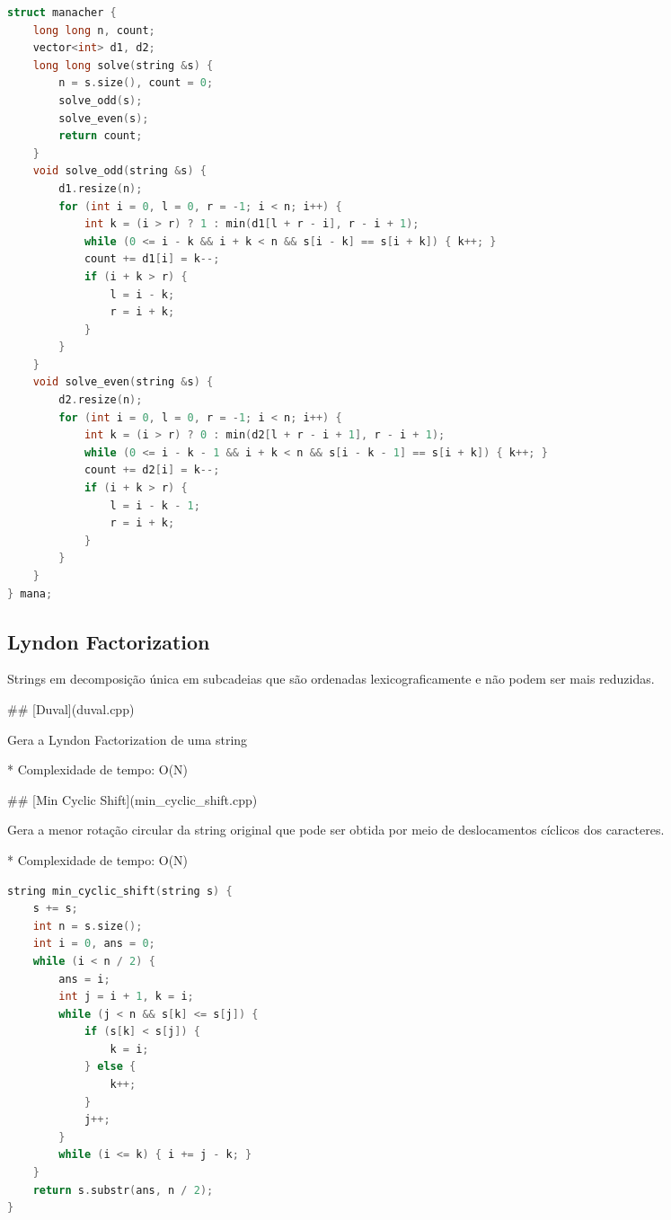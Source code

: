 \documentclass[11pt, a4paper, twoside]{article}
\begin{document}
\begin{lstlisting}[language=C++]
struct manacher {
    long long n, count;
    vector<int> d1, d2;
    long long solve(string &s) {
        n = s.size(), count = 0;
        solve_odd(s);
        solve_even(s);
        return count;
    }
    void solve_odd(string &s) {
        d1.resize(n);
        for (int i = 0, l = 0, r = -1; i < n; i++) {
            int k = (i > r) ? 1 : min(d1[l + r - i], r - i + 1);
            while (0 <= i - k && i + k < n && s[i - k] == s[i + k]) { k++; }
            count += d1[i] = k--;
            if (i + k > r) {
                l = i - k;
                r = i + k;
            }
        }
    }
    void solve_even(string &s) {
        d2.resize(n);
        for (int i = 0, l = 0, r = -1; i < n; i++) {
            int k = (i > r) ? 0 : min(d2[l + r - i + 1], r - i + 1);
            while (0 <= i - k - 1 && i + k < n && s[i - k - 1] == s[i + k]) { k++; }
            count += d2[i] = k--;
            if (i + k > r) {
                l = i - k - 1;
                r = i + k;
            }
        }
    }
} mana;
\end{lstlisting}

\subsection{Lyndon Factorization}


Strings em decomposição única em subcadeias que são ordenadas lexicograficamente e não podem ser mais reduzidas.

\#\# [Duval](duval.cpp)

Gera a Lyndon Factorization de uma string

* Complexidade de tempo: O(N)

\#\# [Min Cyclic Shift](min\_cyclic\_shift.cpp)

Gera a menor rotação circular da string original que pode ser obtida por meio de deslocamentos cíclicos dos caracteres.

* Complexidade de tempo: O(N)


\begin{multicols}{2}
\begin{lstlisting}[language=C++]
string min_cyclic_shift(string s) {
    s += s;
    int n = s.size();
    int i = 0, ans = 0;
    while (i < n / 2) {
        ans = i;
        int j = i + 1, k = i;
        while (j < n && s[k] <= s[j]) {
            if (s[k] < s[j]) {
                k = i;
            } else {
                k++;
            }
            j++;
        }
        while (i <= k) { i += j - k; }
    }
    return s.substr(ans, n / 2);
}
\end{lstlisting}
\end{multicols}
\end{document}
